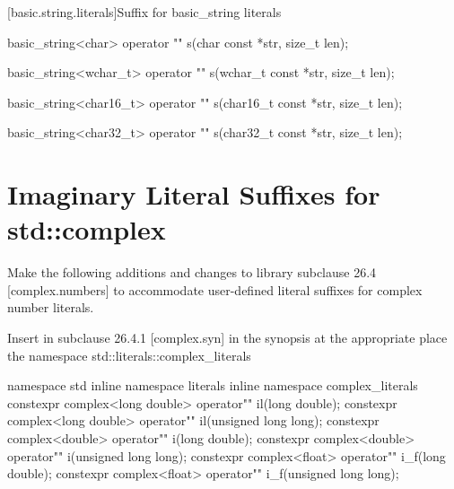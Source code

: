 \documentclass[ebook,11pt,article]{memoir}
\begin{document}
[basic.string.literals]{Suffix for basic_string literals}
\begin{itemdecl}
basic_string<char> operator "" s(char const *str, size_t len);
\end{itemdecl}

\begin{itemdescr}
\pnum
\returns
{}
\end{itemdescr}

\begin{itemdecl}
basic_string<wchar_t> operator "" s(wchar_t const *str, size_t len);
\end{itemdecl}
\begin{itemdescr}
\pnum
\returns
{}
\end{itemdescr}

\begin{itemdecl}
basic_string<char16_t> operator "" s(char16_t const *str, size_t len);
\end{itemdecl}
\begin{itemdescr}
\pnum
\returns
{}
\end{itemdescr}

\begin{itemdecl}
basic_string<char32_t> operator "" s(char32_t const *str, size_t len);
\end{itemdecl}
\begin{itemdescr}
\pnum
\returns
{}
\end{itemdescr}

\section{Imaginary Literal Suffixes for std::complex}
Make the following additions and changes to library subclause 26.4 [complex.numbers] to accommodate user-defined literal suffixes for complex number literals.

Insert in subclause 26.4.1 [complex.syn] in the synopsis at the appropriate place the namespace std::literals::complex_literals
\begin{codeblock}
namespace std{
inline namespace literals{
inline namespace complex_literals{
constexpr complex<long double> operator"" il(long double);
constexpr complex<long double> operator"" il(unsigned long long);
constexpr complex<double> operator"" i(long double);
constexpr complex<double> operator"" i(unsigned long long);
constexpr complex<float> operator"" i_f(long double);
constexpr complex<float> operator"" i_f(unsigned long long);
}}}
\end{codeblock}
\end{document}
